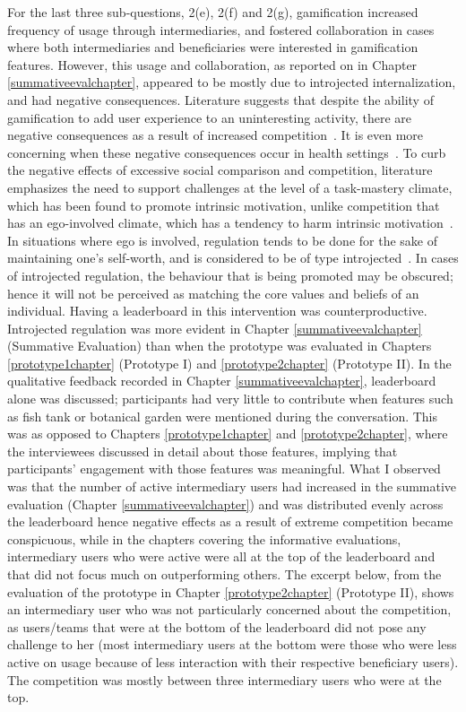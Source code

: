 For the last three sub-questions, 2(e), 2(f) and 2(g), gamification increased frequency of usage through intermediaries, and fostered collaboration in cases where both intermediaries and beneficiaries were interested in gamification features. However, this usage and collaboration, as reported on in Chapter \ref{summativeevalchapter}, appeared to be mostly due to introjected internalization, and had negative consequences. Literature suggests that despite the ability of gamification to add user experience to an uninteresting activity, there are negative consequences as a result of increased competition~\citep{jia2016personality}. It is even more concerning when these negative consequences occur in health settings~\citep{grimes2009toward}. To curb the negative effects of excessive social comparison and competition, literature emphasizes the need to support challenges at the level of a task-mastery climate, which has been found to promote intrinsic motivation, unlike competition that has an ego-involved climate, which has a tendency to harm intrinsic motivation~\citep{saksono2015spaceship}. In situations where ego is involved, regulation tends to be done for the sake of maintaining one's self-worth, and is considered to be of type introjected~\citep{ryan2000:self}. In cases of introjected regulation, the behaviour that is being promoted may be obscured; hence it will not be perceived as matching the core values and beliefs of an individual. Having a leaderboard in this intervention was counterproductive. Introjected regulation was more evident in Chapter \ref{summativeevalchapter} (Summative Evaluation) than when the prototype was evaluated in Chapters \ref{prototype1chapter} (Prototype I) and \ref{prototype2chapter} (Prototype II). In the qualitative feedback recorded in Chapter \ref{summativeevalchapter}, leaderboard alone was discussed; participants had very little to contribute when features such as fish tank or botanical garden were mentioned during the conversation. This was as opposed to Chapters \ref{prototype1chapter} and \ref{prototype2chapter}, where the interviewees discussed in detail about those features, implying that participants' engagement with those features was meaningful. What I observed was that the number of active intermediary users had increased in the summative evaluation (Chapter \ref{summativeevalchapter}) and was distributed evenly across the leaderboard hence negative effects as a result of extreme competition became conspicuous, while in the chapters covering the informative evaluations, intermediary users who were active were all at the top of the leaderboard and that did not focus much on outperforming others. The excerpt below, from the evaluation of the prototype in Chapter \ref{prototype2chapter} (Prototype II), shows an intermediary user who was not particularly concerned about the competition, as users/teams that were at the bottom of the leaderboard did not pose any challenge to her (most intermediary users at the bottom were those who were less active on usage because of less interaction with their respective beneficiary users). The competition was mostly between three intermediary users who were at the top.  

